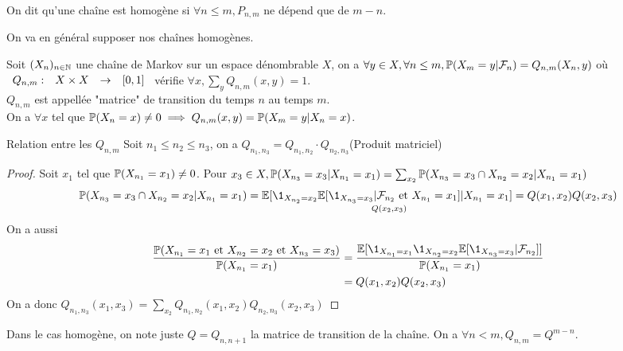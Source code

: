\documentclass[]{report}
\begin{document}
    \begin{df}{}{}
        On dit qu'une chaîne est homogène si $\forall n\le m, P_{n,m}$ ne dépend que de $m-n$.
    \end{df}

    \begin{re}{}{}
        On va en général supposer nos chaînes homogènes.
    \end{re}

    \begin{df}{}{}
        Soit $(X_n)_{n\in\mathbb{N}}$ une chaîne de Markov sur un espace dénombrable $X$, on a $\forall y\in X,\forall n\le m, \mathbb{P}(X_m=y|\mathcal{F}_n)=Q_{n,m}(X_n,y)$ où $\begin{array}{ccccc} Q_{n,m} : & X\times X & \to & [0,1] \end{array}$ vérifie $\forall x, \sum_y Q_{n,m}(x,y)=1$.\\
        $Q_{n,m}$ est appellée "matrice" de transition du temps $n$ au temps $m$.\\
        On a $\forall x$ tel que $\mathbb{P}(X_n=x)\neq0\implies Q_{n,m}(x,y)=\mathbb{P}(X_m=y|X_n=x)$.
    \end{df}

    \begin{prop}{Relation entre les $Q_{n,m}$}{}
        Soit $n_1\le n_2\le n_3$, on a $Q_{n_1,n_3}=Q_{n_1,n_2} \cdot Q_{n_2,n_3}$(Produit matriciel)
    \end{prop}

    \begin{proof}
        Soit $x_1$ tel que $\mathbb{P}(X_{n_1}=x_1)\neq 0$. Pour $x_3\in X, \mathbb{P}(X_{n_3}=x_3|X_{n_1}=x_1)=\sum_{x_2}\mathbb{P}(X_{n_3}=x_3\cap X_{n_2}=x_2|X_{n_1}=x_1)$
        \[\Pa(X_{n_3}=x_3\cap X_{n_2}=x_2|X_{n_1}=x_1)=\Ea[\1_{X_{n_2}=x_2}\underset{Q(x_2,x_3)}{\Ea[\1_{X_{n_3}=x_3}|\Fr_{n_2}\text{ et }X_{n_1}=x_1]}|X_{n_1}=x_1]=Q(x_1,x_2)Q(x_2,x_3)\]
        On a aussi
        \begin{align*}
            \frac{\Pa(X_{n_1}=x_1\text{ et }X_{n_2}=x_2\text{ et }X_{n_3}=x_3)}{\Pa(X_{n_1}=x_1)}&=\frac{\Ea[\1_{X_{n_1}=x_1}\1_{X_{n_2}=x_2}\Ea[\1_{X_{n_3}=x_3}|\Fr_{n_2}]]}{\Pa(X_{n_1}=x_1)}\\
            &=Q(x_1,x_2)Q(x_2,x_3)
        \end{align*}
        On a donc $Q_{n_1,n_3}(x_1,x_3)=\sum_{x_2}Q_{n_1,n_2}(x_1,x_2)Q_{n_2,n_3}(x_2,x_3)$
    \end{proof}

    \begin{re}{}{}
        Dans le cas homogène, on note juste $Q=Q_{n,n+1}$ la matrice de transition de la chaîne. On a $\forall n<m,Q_{n,m}=Q^{m-n}$.
    \end{re}
\end{document}
